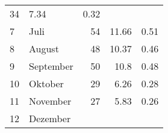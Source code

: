 \begin{longtable}{lXrrr}
       \num{34} &
       \num[round-mode=places,round-precision=2]{7.34} &
         \num[round-mode=places,round-precision=2]{0.32} \\

     7 &
     \multicolumn{1}{X}{ Juli   } &


       \num{54} &
       \num[round-mode=places,round-precision=2]{11.66} &
         \num[round-mode=places,round-precision=2]{0.51} \\

     8 &
     \multicolumn{1}{X}{ August   } &


       \num{48} &
       \num[round-mode=places,round-precision=2]{10.37} &
         \num[round-mode=places,round-precision=2]{0.46} \\

     9 &
     \multicolumn{1}{X}{ September   } &


       \num{50} &
       \num[round-mode=places,round-precision=2]{10.8} &
         \num[round-mode=places,round-precision=2]{0.48} \\

     10 &
     \multicolumn{1}{X}{ Oktober   } &


       \num{29} &
       \num[round-mode=places,round-precision=2]{6.26} &
         \num[round-mode=places,round-precision=2]{0.28} \\

     11 &
     \multicolumn{1}{X}{ November   } &


       \num{27} &
       \num[round-mode=places,round-precision=2]{5.83} &
         \num[round-mode=places,round-precision=2]{0.26} \\

     12 &
     \multicolumn{1}{X}{ Dezember   } &



\end{longtable}
